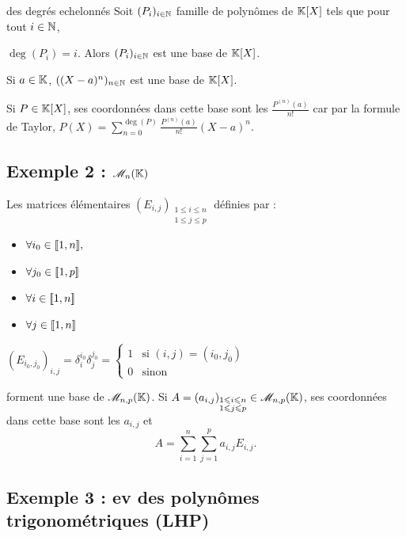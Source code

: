 \begin{theoreme}{des degrés echelonnés}{}
    Soit $(P_i)_{i \in \mathbb{N}}$ famille de polynômes de $\mathbb{K}[X]$ tels que pour tout $i \in \mathbb{N}$,

    $\deg(P_i) = i$. Alors $(P_i)_{i \in \mathbb{N}}$ est une base de $\mathbb{K}[X]$.
\end{theoreme}



\begin{exemple}
    Si $a \in \mathbb{K}$, $((X - a)^n)_{n \in \mathbb{N}}$ est une base de $\mathbb{K}[X]$.

    Si $P \in \mathbb{K}[X]$, ses coordonnées dans cette base sont les $\frac{P^{(n)}(a)}{n!}$ 
    car par la formule de Taylor, $\displaystyle P(X) = \sum_{n=0}^{\deg(P)} \frac{P^{(n)}(a)}{n!} (X - a)^n$. 
\end{exemple}

\subsection{Exemple 2 : \texorpdfstring{$\mathscr M_n(\mathbb{K})$}{Mn(K)}}

Les matrices élémentaires $(E_{i,j})_{\substack{1 \leqslant i \leqslant n \\ 1 \leqslant j \leqslant p}}$ 
définies par : 

\begin{itemize}
    \item $\forall i_0 \in [\![1, n]\!],$
    \item $\forall j_0 \in [\![1, p]\!] $ 
    \item $\forall i \in [\![1, n]\!] $ 
    \item $\forall j \in [\![1, n]\!]$  
\end{itemize}

$(E_{i_0, j_0})_{i,j} = \delta_i^{i_0} \delta_j^{j_0} = \begin{cases}
    1 & \text{si } (i,j) = (i_0, j_0) \\
    0 & \text{sinon}
\end{cases}$

forment une base de $\mathscr M_{n, p}(\mathbb{K})$. Si $A = (a_{i, j})_{\substack{1 \leqslant i \leqslant n \\ 1 \leqslant j \leqslant p}} \in \mathscr M_{n, p}(\mathbb{K})$, 
ses coordonnées dans cette base sont les $a_{i, j}$ et 
$$A = \sum_{i=1}^n \sum_{j=1}^p a_{i, j} E_{i, j}.$$


\subsection{Exemple 3 : ev des polynômes trigonométriques (LHP)}

